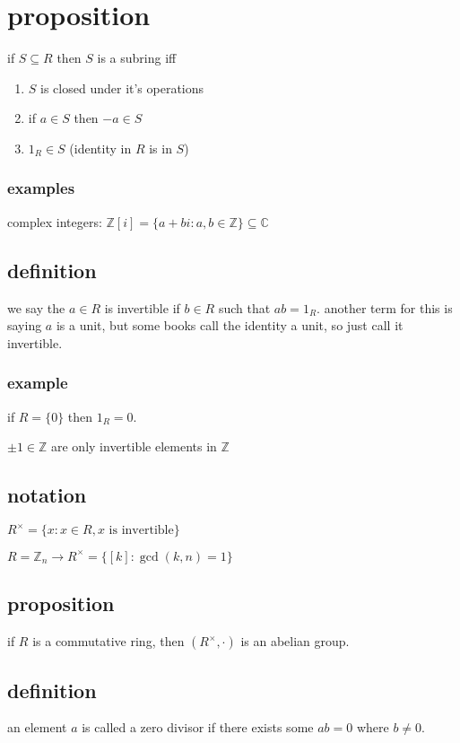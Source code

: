 \documentclass[letterpaper]{article}
\begin{document}
\section*{proposition}
if $S\subseteq R$ then $S$ is a subring iff
\begin{enumerate}
\item
$S$ is closed under it's operations
\item
if $a\in S$ then $-a\in S$
\item
$1_R\in S$ (identity in $R$ is in $S$)
\end{enumerate}

\subsubsection*{examples}
complex integers: $\mathbb{Z}[i]=\{a+bi:a,b\in\mathbb{Z}\}\subseteq \mathbb{C}$

\subsection*{definition}
we say the $a\in R$ is invertible if $b\in R$ such that $ab=1_R$. another term for this is saying $a$ is a unit, but some books call the identity a unit, so just call it invertible.

\subsubsection*{example}
if $R=\{0\}$ then $1_R=0$.

$\pm 1\in \mathbb{Z}$ are only invertible elements in $\mathbb{Z}$

\subsection*{notation}
$R^{\times}=\{x:x\in R,x \text{ is invertible}\}$

$R=\mathbb{Z}_n\to R^\times=\{[k]:\gcd(k,n)=1\}$

\subsection*{proposition}
if $R$ is a commutative ring, then $(R^\times,\cdot)$ is an abelian group.

\subsection*{definition}
an element $a$ is called a zero divisor if there exists some $ab=0$ where $b\ne 0$.
\end{document}

